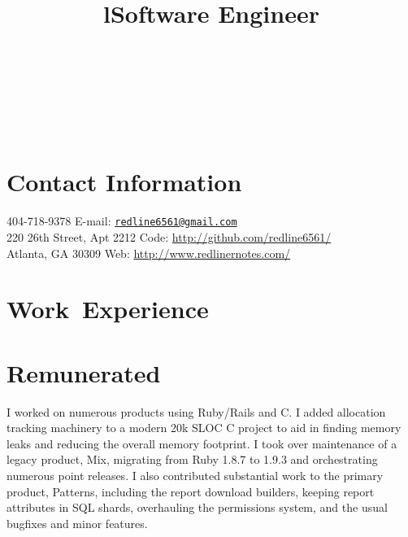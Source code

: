\documentclass[margintitle,line]{res}
\renewcommand{\subsection}[1]{\section{\normalfont #1}}
\begin{document}

\begin{resume}

\begin{format}
\\
\title{l}\\
\body\\
\end{format}



\section{Contact Information}

404-718-9378 \hfill {E-mail:} \href{mailto:redline6561@gmail.com}{\nolinkurl{redline6561@gmail.com}} \\
220 26th Street, Apt 2212 \hfill {Code:} \url{http://github.com/redline6561/} \\
Atlanta, GA 30309 \hfill {Web:} \url{http://www.redlinernotes.com/} \\


\section{\mbox{Work Experience}}

\subsection{Remunerated}

\title{Software Engineer}
\begin{position}
  I worked on numerous products using Ruby/Rails and C. I added allocation
  tracking machinery to a modern 20k SLOC C project to aid in finding memory
  leaks and reducing the overall memory footprint. I took over maintenance of
  a legacy product, Mix, migrating from Ruby 1.8.7 to 1.9.3 and orchestrating
  numerous point releases. I also contributed substantial work to the primary
  product, Patterns, including the report download builders, keeping report
  attributes in SQL shards, overhauling the permissions system, and the usual
  bugfixes and minor features.
\end{position}


\end{resume}
\end{document}
